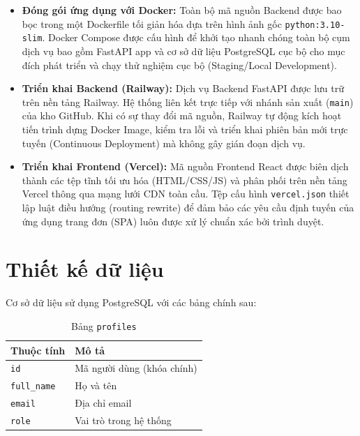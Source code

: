 \documentclass[12pt,a4paper]{report}
\begin{document}
\begin{itemize}[leftmargin=1.5em, itemsep=4pt]
    \item \textbf{Đóng gói ứng dụng với Docker:} Toàn bộ mã nguồn Backend được bao bọc trong một Dockerfile tối giản hóa dựa trên hình ảnh gốc \texttt{python:3.10-slim}. Docker Compose được cấu hình để khởi tạo nhanh chóng toàn bộ cụm dịch vụ bao gồm FastAPI app và cơ sở dữ liệu PostgreSQL cục bộ cho mục đích phát triển và chạy thử nghiệm cục bộ (Staging/Local Development).
    \item \textbf{Triển khai Backend (Railway):} Dịch vụ Backend FastAPI được lưu trữ trên nền tảng Railway. Hệ thống liên kết trực tiếp với nhánh sản xuất (\texttt{main}) của kho GitHub. Khi có sự thay đổi mã nguồn, Railway tự động kích hoạt tiến trình dựng Docker Image, kiểm tra lỗi và triển khai phiên bản mới trực tuyến (Continuous Deployment) mà không gây gián đoạn dịch vụ.
    \item \textbf{Triển khai Frontend (Vercel):} Mã nguồn Frontend React được biên dịch thành các tệp tĩnh tối ưu hóa (HTML/CSS/JS) và phân phối trên nền tảng Vercel thông qua mạng lưới CDN toàn cầu. Tệp cấu hình \texttt{vercel.json} thiết lập luật điều hướng (routing rewrite) để đảm bảo các yêu cầu định tuyến của ứng dụng trang đơn (SPA) luôn được xử lý chuẩn xác bởi trình duyệt.
\end{itemize}

\chapter{Thiết kế dữ liệu}

Cơ sở dữ liệu sử dụng PostgreSQL với các bảng chính sau:

\begin{table}[h!]
  \centering
  \caption{Bảng \texttt{profiles}}
  \begin{tabular}{L{3.5cm} L{8cm}}
    \toprule
    \textbf{Thuộc tính} & \textbf{Mô tả} \\
    \midrule
    \texttt{id}         & Mã người dùng (khóa chính) \\
    \texttt{full\_name} & Họ và tên \\
    \texttt{email}      & Địa chỉ email \\
    \texttt{role}       & Vai trò trong hệ thống \\
    \bottomrule
  \end{tabular}
\end{table}
\end{document}
